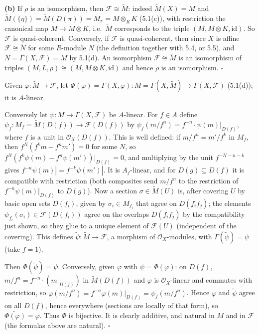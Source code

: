 \documentclass[11pt]{article}
\begin{document}
\textbf{(b)} If $\rho$ is an isomorphism, then $\mathcal F\cong\widetilde M$: indeed $\widetilde M(X)=M$ and $\widetilde M(\{\eta\})=\widetilde M(D(\pi))=M_\pi=M\otimes_RK$ (5.1(c)), with restriction the canonical map $M\to M\otimes K$, i.e.\ $\widetilde M$ corresponds to the triple $(M,M\otimes K,\mathrm{id})$. So $\mathcal F$ is quasi-coherent. Conversely, if $\mathcal F$ is quasi-coherent, then since $X$ is affine $\mathcal F\cong\widetilde N$ for some $R$-module $N$ (the definition together with 5.4, or 5.5), and $N=\Gamma(X,\mathcal F)=M$ by 5.1(d). An isomorphism $\mathcal F\cong\widetilde M$ is an isomorphism of triples $(M,L,\rho)\cong(M,M\otimes K,\mathrm{id})$ and hence $\rho$ is an isomorphism. \hfill$\square$

\pf
Given $\varphi:\widetilde M\to\mathcal F$, let $\Phi(\varphi)=\Gamma(X,\varphi):M=\Gamma(X,\widetilde M)\to\Gamma(X,\mathcal F)$ (5.1(d)); it is $A$-linear.

Conversely let $\psi:M\to\Gamma(X,\mathcal F)$ be $A$-linear. For $f\in A$ define $\psi_f:M_f=\widetilde M(D(f))\to\mathcal F(D(f))$ by $\psi_f(m/f^n)=f^{-n}\cdot\psi(m)|_{D(f)}$, where $f$ is a unit in $\mathcal O_X(D(f))$. This is well defined: if $m/f^n=m'/f^k$ in $M_f$, then $f^N(f^km-f^nm')=0$ for some $N$, so $f^N(f^k\psi(m)-f^n\psi(m'))|_{D(f)}=0$, and multiplying by the unit $f^{-N-n-k}$ gives $f^{-n}\psi(m)|=f^{-k}\psi(m')|$. It is $A_f$-linear, and for $D(g)\subseteq D(f)$ it is compatible with restriction (both composites send $m/f^n$ to the restriction of $f^{-n}\psi(m)|_{D(f)}$ to $D(g)$). Now a section $\sigma\in\widetilde M(U)$ is, after covering $U$ by basic open sets $D(f_i)$, given by $\sigma_i\in M_{f_i}$ that agree on $D(f_if_j)$; the elements $\psi_{f_i}(\sigma_i)\in\mathcal F(D(f_i))$ agree on the overlaps $D(f_if_j)$ by the compatibility just shown, so they glue to a unique element of $\mathcal F(U)$ (independent of the covering). This defines $\widetilde\psi:\widetilde M\to\mathcal F$, a morphism of $\mathcal O_X$-modules, with $\Gamma(\widetilde\psi)=\psi$ (take $f=1$).

Then $\Phi(\widetilde\psi)=\psi$. Conversely, given $\varphi$ with $\psi=\Phi(\varphi)$: on $D(f)$, $m/f^n=f^{-n}\cdot(m|_{D(f)})$ in $\widetilde M(D(f))$ and $\varphi$ is $\mathcal O_X$-linear and commutes with restriction, so $\varphi(m/f^n)=f^{-n}\varphi(m)|_{D(f)}=\psi_f(m/f^n)$. Hence $\varphi$ and $\widetilde\psi$ agree on all $D(f)$, hence everywhere (sections are locally of that form), so $\widetilde{\Phi(\varphi)}=\varphi$. Thus $\Phi$ is bijective. It is clearly additive, and natural in $M$ and in $\mathcal F$ (the formulas above are natural). \hfill$\square$
\end{document}
